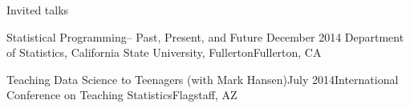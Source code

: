 \documentclass{resume} %
\begin{document}
\begin{rSection}{Invited talks}
\begin{sSubsection}{Statistical Programming-- Past, Present, and Future}{ }{December 2014 }{Department of Statistics, California State University, Fullerton}{Fullerton, CA}
\end{sSubsection}

\begin{sSubsection}{Teaching Data Science to Teenagers}{ (with Mark Hansen)}{July 2014}{International Conference on Teaching Statistics}{Flagstaff, AZ}
\end{sSubsection}


\end{rSection}

\clearpage
\end{document}
